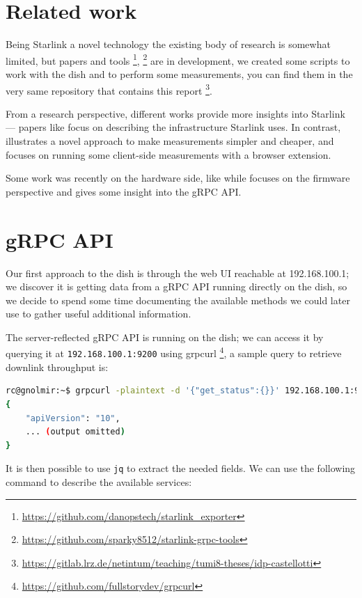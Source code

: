 \documentclass[IN,11pt,twoside,openright,idp,english]{tumthesis}
\begin{document}
\section{Related work}
    
Being Starlink a novel technology the existing body of research is somewhat limited, but papers and tools \footnote{\url{https://github.com/danopstech/starlink\_exporter}}, \footnote{\url{https://github.com/sparky8512/starlink-grpc-tools}} are in development, we created some scripts to work with the dish and to perform some measurements, you can find them in the very same repository that contains this report \footnote{\url{https://gitlab.lrz.de/netintum/teaching/tumi8-theses/idp-castellotti}}.
    
From a research perspective, different works provide more insights into Starlink — papers like \cite{pan2023measuring} focus on describing the infrastructure Starlink uses. In contrast, \cite{izhikevich2023democratizing} illustrates a novel approach to make measurements simpler and cheaper, and \cite{browser-side} focuses on running some client-side measurements with a browser extension.
    
Some work was recently on the hardware side, like \cite{glitching} while \cite{quarkslab} focuses on the firmware perspective and gives some insight into the gRPC API.
    
\section{gRPC API}
    
Our first approach to the dish is through the web UI reachable at 192.168.100.1; we discover it is getting data from a gRPC API running directly on the dish, so we decide to spend some time documenting the available methods we could later use to gather useful additional information.
    
The server-reflected gRPC API is running on the dish; we can access it by querying it at \texttt{192.168.100.1:9200} using grpcurl \footnote{\url{https://github.com/fullstorydev/grpcurl}}, a sample query to retrieve downlink throughput is:
    
\begin{lstlisting}[language=bash]
rc@gnolmir:~$ grpcurl -plaintext -d '{"get_status":{}}' 192.168.100.1:9200 SpaceX.API.Device.Device/Handle
{
    "apiVersion": "10",
    ... (output omitted)
}
\end{lstlisting}

It is then possible to use \texttt{jq} to extract the needed fields. We can use the following command to describe the available services:
    
\end{document}

